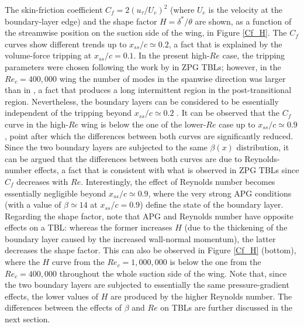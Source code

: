 \documentclass[preprint,12pt,authoryear]{elsarticle}
\begin{document}
The skin-friction coefficient $C_{f}= 2 \left (u_{\tau} / U_{e} \right )^{2}$ (where $U_{e}$ is the velocity at the boundary-layer edge) and the shape factor $H=\delta^{*} / \theta$ are shown, as a function of the streamwise position on the suction side of the wing, in Figure \ref{Cf_H}. The $C_{f}$ curves show different trends up to $x_{ss}/c \simeq 0.2$, a fact that is explained by the volume-force tripping at $x_{ss}/c=0.1$. In the present high-$Re$ case, the tripping parameters were chosen following the work by \cite{schlatter_orlu12} in ZPG TBLs; however, in the $Re_{c}=400,000$ wing the number of modes in the spanwise direction was larger than in \cite{schlatter_orlu12}, a fact that produces a long intermittent region in the post-transitional region. Nevertheless, the boundary layers can be considered to be essentially independent of the tripping beyond $x_{ss} / c \simeq 0.2$ \citep{vinuesa_diagnostic}. It can be observed that the $C_{f}$ curve in the high-$Re$ wing is below the one of the lower-$Re$ case up to $x_{ss}/c \simeq 0.9$, point after which the differences between both curves are significantly reduced. Since the two boundary layers are subjected to the same $\beta(x)$ distribution, it can be argued that the differences between both curves are due to Reynolds-number effects, a fact that is consistent with what is observed in ZPG TBLs since $C_{f}$ decreases with $Re$. Interestingly, the effect of Reynolds number becomes essentially negligible beyond $x_{ss}/c \simeq 0.9$, where the very strong APG conditions (with a value of $\beta \simeq 14$ at $x_{ss}/c=0.9$) define the state of the boundary layer. Regarding the shape factor, note that APG and Reynolds number have opposite effects on a TBL: whereas the former increases $H$ (due to the thickening of the boundary layer caused by the increased wall-normal momentum), the latter decreases the shape factor. This can also be observed in Figure \ref{Cf_H} (bottom), where the $H$ curve from the $Re_{c}=1,000,000$ is below the one from the $Re_{c}=400,000$ throughout the whole suction side of the wing. Note that, since the two boundary layers are subjected to essentially the same pressure-gradient effects, the lower values of $H$ are produced by the higher Reynolds number. The differences between the effects of $\beta$ and $Re$ on TBLs are further discussed in the next section.
\end{document}
